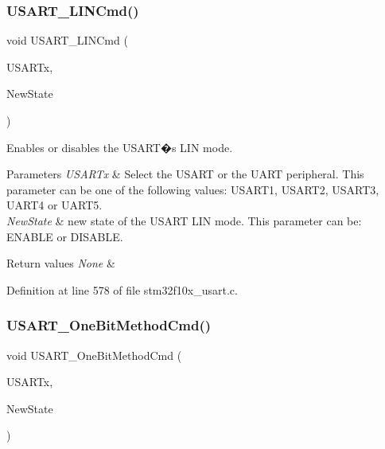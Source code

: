 \subsubsection{\texorpdfstring{U\+S\+A\+R\+T\+\_\+\+L\+I\+N\+Cmd()}{USART\_LINCmd()}}
{\footnotesize\ttfamily void U\+S\+A\+R\+T\+\_\+\+L\+I\+N\+Cmd (\begin{DoxyParamCaption}\item[{\hyperlink{struct_u_s_a_r_t___type_def}{U\+S\+A\+R\+T\+\_\+\+Type\+Def} $\ast$}]{U\+S\+A\+R\+Tx,  }\item[{\hyperlink{group___exported__types_gac9a7e9a35d2513ec15c3b537aaa4fba1}{Functional\+State}}]{New\+State }\end{DoxyParamCaption})}



Enables or disables the U\+S\+A\+R\+T�s L\+IN mode. 


\begin{DoxyParams}{Parameters}
{\em U\+S\+A\+R\+Tx} & Select the U\+S\+A\+RT or the U\+A\+RT peripheral. This parameter can be one of the following values\+: U\+S\+A\+R\+T1, U\+S\+A\+R\+T2, U\+S\+A\+R\+T3, U\+A\+R\+T4 or U\+A\+R\+T5. \\
\hline
{\em New\+State} & new state of the U\+S\+A\+RT L\+IN mode. This parameter can be\+: E\+N\+A\+B\+LE or D\+I\+S\+A\+B\+LE. \\
\hline
\end{DoxyParams}

\begin{DoxyRetVals}{Return values}
{\em None} & \\
\hline
\end{DoxyRetVals}


Definition at line 578 of file stm32f10x\+\_\+usart.\+c.

\mbox{\label{group___u_s_a_r_t___private___functions_ga3ed89ea8765d851510cfe90f7d90cbbb}} 
\subsubsection{\texorpdfstring{U\+S\+A\+R\+T\+\_\+\+One\+Bit\+Method\+Cmd()}{USART\_OneBitMethodCmd()}}
{\footnotesize\ttfamily void U\+S\+A\+R\+T\+\_\+\+One\+Bit\+Method\+Cmd (\begin{DoxyParamCaption}\item[{\hyperlink{struct_u_s_a_r_t___type_def}{U\+S\+A\+R\+T\+\_\+\+Type\+Def} $\ast$}]{U\+S\+A\+R\+Tx,  }\item[{\hyperlink{group___exported__types_gac9a7e9a35d2513ec15c3b537aaa4fba1}{Functional\+State}}]{New\+State }\end{DoxyParamCaption})}



